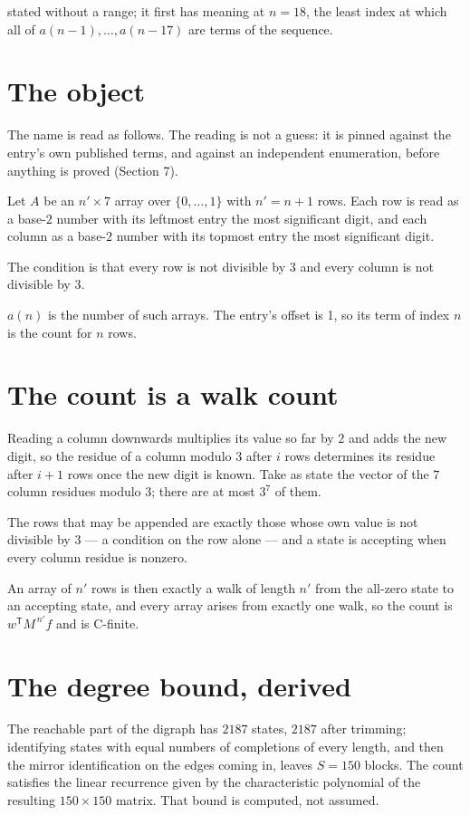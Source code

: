 \documentclass[11pt]{article}
\theoremstyle{definition}
\begin{document}
stated without a range; it first has meaning at $n = 18$, the least index at which all of $a(n-1),\dots,a(n-17)$ are terms of the sequence.

\section{The object}

The name is read as follows. The reading is not a guess: it is pinned against the entry's own published terms, and against an independent enumeration, before anything is proved (Section 7).

Let $A$ be an $n' \times 7$ array over $\{0,\dots,1\}$ with $n' = n + 1$ rows. Each row is read as a base-$2$ number with its leftmost entry the most significant digit, and each column as a base-$2$ number with its topmost entry the most significant digit.

The condition is that every row is not divisible by $3$ and every column is not divisible by $3$.

$a(n)$ is the number of such arrays. The entry's offset is 1, so its term of index $n$ is the count for $n$ rows.

\section{The count is a walk count}

Reading a column downwards multiplies its value so far by $2$ and adds the new digit, so the residue of a column modulo $3$ after $i$ rows determines its residue after $i+1$ rows once the new digit is known. Take as state the vector of the $7$ column residues modulo $3$; there are at most $3^{7}$ of them.

The rows that may be appended are exactly those whose own value is not divisible by $3$ --- a condition on the row alone --- and a state is accepting when every column residue is nonzero.

An array of $n'$ rows is then exactly a walk of length $n'$ from the all-zero state to an accepting state, and every array arises from exactly one walk, so the count is $w^{\mathsf T}M^{\,n'}f$ and is C-finite.

\section{The degree bound, derived}

The reachable part of the digraph has $2187$ states, $2187$ after trimming; identifying states with equal numbers of completions of every length, and then the mirror identification on the edges coming in, leaves $S = 150$ blocks. The count satisfies the linear recurrence given by the characteristic polynomial of the resulting $150\times150$ matrix. That bound is computed, not assumed.
\end{document}
